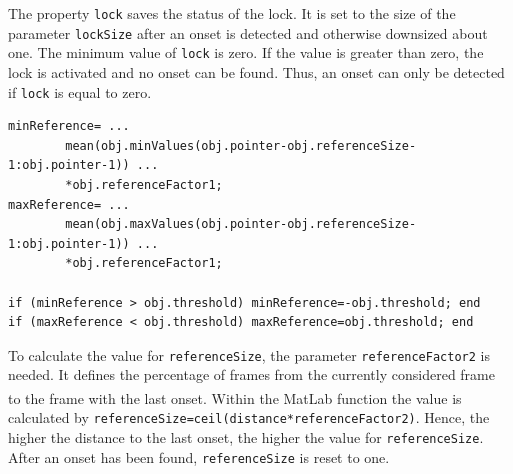 The property \lstinline{lock} saves the status of the lock. It is set to the size of the parameter \lstinline{lockSize} after an onset is detected and otherwise downsized about one. The minimum value of \lstinline{lock} is zero. If the value is greater than zero, the lock is activated and no onset can be found. Thus, an onset can only be detected if \lstinline{lock} is equal to zero.   

\begin{lstlisting}[caption={calculation of minReference and maxReference},label={lst:onset1}]
minReference= ...
		mean(obj.minValues(obj.pointer-obj.referenceSize-1:obj.pointer-1)) ...
		*obj.referenceFactor1;
maxReference= ...
		mean(obj.maxValues(obj.pointer-obj.referenceSize-1:obj.pointer-1)) ...
		*obj.referenceFactor1;

if (minReference > obj.threshold) minReference=-obj.threshold; end
if (maxReference < obj.threshold) maxReference=obj.threshold; end  
\end{lstlisting}

To calculate the value for \lstinline{referenceSize}, the parameter \lstinline{referenceFactor2} is needed. It defines the percentage of frames from the currently considered frame to the frame with the last onset. Within the MatLab\textsuperscript{\textregistered} function the value is calculated by \lstinline{referenceSize=ceil(distance*referenceFactor2)}. Hence, the higher the distance to the last onset, the higher the value for \lstinline{referenceSize}. After an onset has been found, \lstinline{referenceSize} is reset to one.

